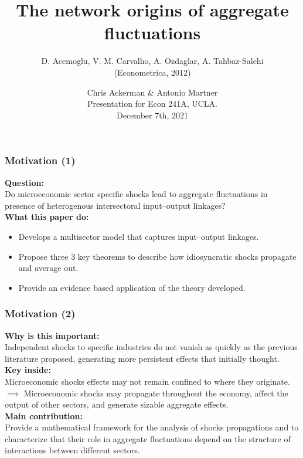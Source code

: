 \documentclass{beamer}
\title[] %
{The network origins of aggregate fluctuations }
\author[] %
{D. Acemoglu, V. M. Carvalho, A. Ozdaglar, A. Tahbaz-Salehi  \\
(Econometrica, 2012)}
\date[] %
{Chris Ackerman \& Antonio Martner\\
Presentation for Econ 241A, UCLA.\\
December 7th, 2021}
\begin{document}
\frame{\titlepage}

\begin{frame}
\frametitle{Motivation (1)}
\justifying

{\bf Question:}\\
Do microeconomic sector specific shocks lead to aggregate fluctuations in 
presence of heterogenous intersectoral input–output linkages?\\
\vspace{0.5cm}
{\bf What this paper do:}
\begin{itemize}
  \item Develops a multisector model that captures input–output linkages.
  \item Propose three 3 key theorems to describe how idiosyncratic shocks propagate
  and average out.
  \item Provide an evidence based application of the theory developed.
\end{itemize}

\end{frame}
\begin{frame}
    \frametitle{Motivation (2)}
    \justifying
    {\bf Why is this important:}\\
    Independent shocks to specific industries do not vanish as quickly as the
    previous literature proposed, generating more persistent effects that initially
    thought.\\
\vspace{0.5cm}
{\bf Key inside:}\\
Microeconomic shocks effects may not remain confined
to where they originate.\\
$\implies$ Microeconomic shocks may propagate
throughout the economy, affect the output of other sectors, and generate sizable
aggregate effects.\\
\vspace{0.5cm}
    {\bf Main contribution:}\\
    Provide a mathematical
    framework for the analysis of shocks propagations and to characterize
    that their role in aggregate fluctuations depend on the structure of 
    interactions between different sectors.
    
    \end{frame}
\end{document}
